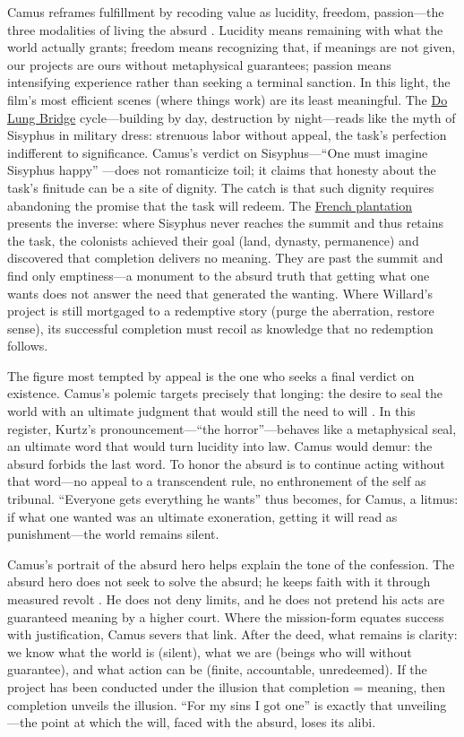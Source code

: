 Camus reframes fulfillment by recoding value as lucidity, freedom, passion—the three modalities
of living the absurd \parencite[pp.~54--71]{CamusMyth1991}. Lucidity means remaining with what
the world actually grants; freedom means recognizing that, if meanings are not given, our
projects are ours without metaphysical guarantees; passion means intensifying experience rather
than seeking a terminal sanction. In this light, the film's most efficient scenes (where things
work) are its least meaningful. The \hyperref[scene:do-lung-bridge]{Do Lung Bridge}
cycle—building by day, destruction by night—reads like the myth of Sisyphus in military dress:
strenuous labor without appeal, the
task's perfection indifferent to significance. Camus's verdict on Sisyphus—``One must imagine
Sisyphus happy'' \parencite[p.~123]{CamusMyth1991}—does not romanticize toil; it claims that
honesty about the task's finitude can be a site of dignity. The catch is that such dignity
requires abandoning the promise that the task will redeem. The
\hyperref[scene:french-plantation]{French plantation} presents the inverse: where Sisyphus
never reaches the summit and thus retains the task, the colonists achieved their goal (land,
dynasty, permanence) and discovered that completion delivers no meaning. They are past the
summit and find only emptiness—a monument to the absurd truth that getting what one wants does
not answer the need that generated the wanting. Where Willard's project is still mortgaged to a
redemptive story (purge the aberration, restore sense), its successful completion must recoil
as knowledge that no redemption follows.

The figure most tempted by appeal is the one who seeks a final verdict on existence. Camus's
polemic targets precisely that longing: the desire to seal the world with an ultimate judgment
that would still the need to will \parencite[pp.~53--60]{CamusMyth1991}. In this register,
Kurtz's pronouncement—``the horror''—behaves like a metaphysical seal, an ultimate word that
would turn lucidity into law. Camus would demur: the absurd forbids the last word. To honor the
absurd is to continue acting without that word—no appeal to a transcendent rule, no enthronement
of the self as tribunal. ``Everyone gets everything he wants'' thus becomes, for Camus, a
litmus: if what one wanted was an ultimate exoneration, getting it will read as punishment—the
world remains silent.

Camus's portrait of the absurd hero helps explain the tone of the confession. The absurd hero
does not seek to solve the absurd; he keeps faith with it through measured revolt
\parencite[pp.~54--60, 121--123]{CamusMyth1991}. He does not deny limits, and he does not
pretend his acts are guaranteed meaning by a higher court. Where the mission-form equates
success with justification, Camus severs that link. After the deed, what remains is clarity:
we know what the world is (silent), what we are (beings who will without guarantee), and what
action can be (finite, accountable, unredeemed). If the project has been conducted under the
illusion that completion = meaning, then completion unveils the illusion. ``For my sins I got
one'' is exactly that unveiling—the point at which the will, faced with the absurd, loses its
alibi.

